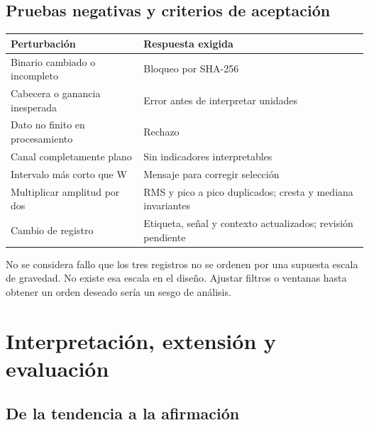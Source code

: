 \documentclass[
  spanish,
  10.5pt,
  a4paper,
  DIV=11,
  numbers=noendperiod]{scrartcl}
\newcounter{none} %
\begin{document}
\subsection{Pruebas negativas y criterios de
aceptación}\label{pruebas-negativas-y-criterios-de-aceptaciuxf3n}

{\def\LTcaptype{none} %
\begin{longtable}[]{@{}
  >{\raggedright\arraybackslash}p{}
  >{\raggedright\arraybackslash}p{}@{}}
\toprule\noalign{}
\begin{minipage}[b]{\linewidth}\raggedright
Perturbación
\end{minipage} & \begin{minipage}[b]{\linewidth}\raggedright
Respuesta exigida
\end{minipage} \\
\midrule\noalign{}
\endhead
\bottomrule\noalign{}
\endlastfoot
Binario cambiado o incompleto & Bloqueo por SHA-256 \\
Cabecera o ganancia inesperada & Error antes de interpretar unidades \\
Dato no finito en procesamiento & Rechazo \\
Canal completamente plano & Sin indicadores interpretables \\
Intervalo más corto que W & Mensaje para corregir selección \\
Multiplicar amplitud por dos & RMS y pico a pico duplicados; cresta y
mediana invariantes \\
Cambio de registro & Etiqueta, señal y contexto actualizados; revisión
pendiente \\
\end{longtable}
}

No se considera fallo que los tres registros no se ordenen por una
supuesta escala de gravedad. No existe esa escala en el diseño. Ajustar
filtros o ventanas hasta obtener un orden deseado sería un sesgo de
análisis.

\section{Interpretación, extensión y
evaluación}\label{interpretaciuxf3n-extensiuxf3n-y-evaluaciuxf3n}

\subsection{De la tendencia a la
afirmación}\label{de-la-tendencia-a-la-afirmaciuxf3n}
\end{document}
